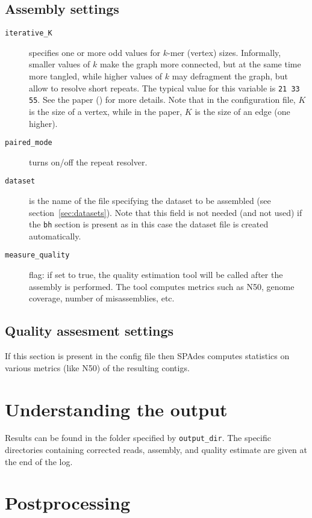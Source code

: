 \documentclass{article}
\def\spades{SPAdes}
\begin{document}
\subsection{Assembly settings}\label{subsec:assembly}
\begin{description}
\item[{\tt iterative\_K}] specifies one or more odd values for $k$-mer (vertex) sizes.  Informally, smaller values of $k$ make the graph more connected, but at the same time more tangled, while higher values of $k$ may defragment the graph, but allow to resolve short repeats. The typical value for this variable is {\tt 21 33 55}. See the paper (\cite{main}) for more details.  Note that in the configuration file, $K$ is the size of a vertex, while in the paper, $K$ is the size of an edge (one higher).

\item[{\tt paired\_mode}] turns on/off the repeat resolver.

\item[{\tt dataset}] is the name of the file specifying the dataset to be assembled
(see section~\ref{sec:datasets}). Note that this field is not needed (and not used)
if the {\tt bh} section is present as in this case the dataset file is created automatically.

\item[{\tt measure\_quality}] flag: if set to true, the quality estimation tool will be called after the assembly is performed.  The tool computes metrics such as N50, genome coverage, number of misassemblies, etc.
\end{description}

\subsection{Quality assesment settings}
If this section is present in the config file then
{\spades} computes statistics on various metrics (like N50) of the resulting contigs.


\section{Understanding the output}
Results can be found in the folder specified by {\tt output\_dir}.
The specific directories containing corrected reads, assembly, and quality estimate are given
at the end of the log.

\section{Postprocessing}
\end{document}
